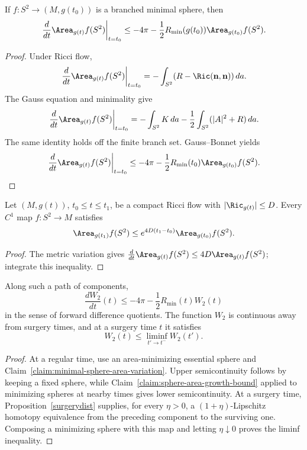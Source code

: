 \begin{claim}
\label{claim:minimal-sphere-area-variation}
\label{varareaform}
If $f\colon S^2\to(M,g(t_0))$ is a branched minimal sphere, then
\[
\left.\frac d{dt}\Area_{g(t)}f(S^2)\right|_{t=t_0}
\le -4\pi-\frac12R_{\min}(g(t_0))\Area_{g(t_0)}f(S^2).
\]
\end{claim}
\begin{proof}
\sketch Under Ricci flow,
\begin{equation}\label{ha1}
\left.\frac d{dt}\Area_{g(t)}f(S^2)\right|_{t=t_0}
=-\int_{S^2}(R-\Ric({\bf n},{\bf n}))\,da.
\end{equation}
The Gauss equation and minimality give
\begin{equation}\label{ha2}
\left.\frac d{dt}\Area_{g(t)}f(S^2)\right|_{t=t_0}
=-\int_{S^2}K\,da-\frac12\int_{S^2}(|A|^2+R)\,da.
\end{equation}
The same identity holds off the finite branch set. Gauss--Bonnet yields
\begin{equation}\label{ha3}
\left.\frac d{dt}\Area_{g(t)}f(S^2)\right|_{t=t_0}
\le-4\pi-\frac12R_{\min}(t_0)\Area_{g(t_0)}f(S^2).
\end{equation}
\end{proof}

\begin{claim}
\label{claim:sphere-area-growth-bound}
Let $(M,g(t))$, $t_0\le t\le t_1$, be a compact Ricci flow with
$|\Ric_{g(t)}|\le D$. Every $C^1$ map $f\colon S^2\to M$ satisfies
\[
\Area_{g(t_1)}f(S^2)\le e^{4D(t_1-t_0)}\Area_{g(t_0)}f(S^2).
\]
\end{claim}
\begin{proof}
\sketch The metric variation gives
$\frac d{dt}\Area_{g(t)}f(S^2)\le4D\Area_{g(t)}f(S^2)$; integrate this
inequality.
\end{proof}

\begin{lemma}
\label{lem:w2-forward-difference-quotient}
\label{W_2}
Along such a path of components,
\[
\frac{dW_2}{dt}(t)\le-4\pi-\frac12R_{\min}(t)W_2(t)
\]
in the sense of forward difference quotients. The function $W_2$ is continuous
away from surgery times, and at a surgery time $t$ it satisfies
\[
W_2(t)\le\liminf_{t'\to t^-}W_2(t').
\]
\end{lemma}
\begin{proof}
\sketch At a regular time, use an area-minimizing essential sphere and
Claim~\ref{claim:minimal-sphere-area-variation}. Upper semicontinuity follows
by keeping a fixed sphere, while Claim~\ref{claim:sphere-area-growth-bound}
applied to minimizing spheres at nearby times gives lower semicontinuity. At a
surgery time, Proposition~\ref{surgerydist} supplies, for every $\eta>0$, a
$(1+\eta)$-Lipschitz homotopy equivalence from the preceding component to the
surviving one. Composing a minimizing sphere with this map and letting
$\eta\downarrow0$ proves the liminf inequality.
\end{proof}


